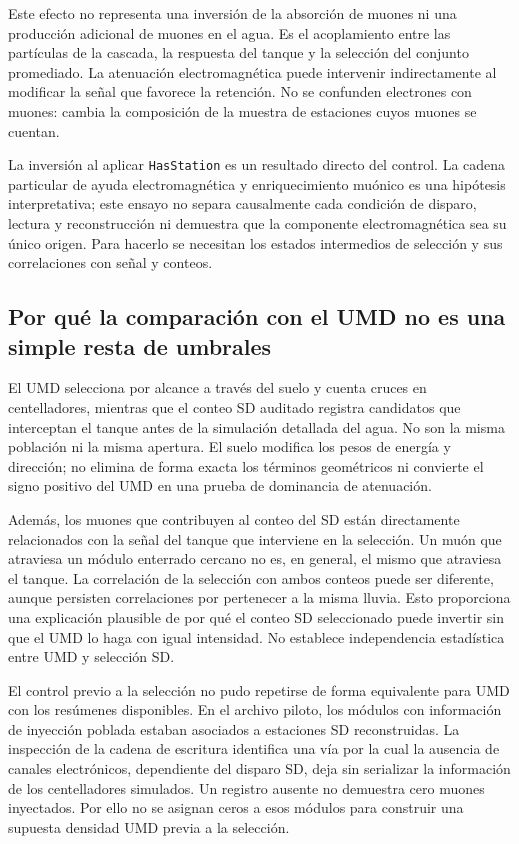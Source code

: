Este efecto no representa una inversión de la absorción de muones ni una producción adicional de muones en el agua. Es el acoplamiento entre las partículas de la cascada, la respuesta del tanque y la selección del conjunto promediado. La atenuación electromagnética puede intervenir indirectamente al modificar la señal que favorece la retención. No se confunden electrones con muones: cambia la composición de la muestra de estaciones cuyos muones se cuentan.

La inversión al aplicar \texttt{HasStation} es un resultado directo del control. La cadena particular de ayuda electromagnética y enriquecimiento muónico es una hipótesis interpretativa; este ensayo no separa causalmente cada condición de disparo, lectura y reconstrucción ni demuestra que la componente electromagnética sea su único origen. Para hacerlo se necesitan los estados intermedios de selección y sus correlaciones con señal y conteos.

\subsection{Por qué la comparación con el UMD no es una simple resta de umbrales}
\label{subsec:umd_poblacion_seleccion}

El UMD selecciona por alcance a través del suelo y cuenta cruces en centelladores, mientras que el conteo SD auditado registra candidatos que interceptan el tanque antes de la simulación detallada del agua. No son la misma población ni la misma apertura. El suelo modifica los pesos de energía y dirección; no elimina de forma exacta los términos geométricos ni convierte el signo positivo del UMD en una prueba de dominancia de atenuación.

Además, los muones que contribuyen al conteo del SD están directamente relacionados con la señal del tanque que interviene en la selección. Un muón que atraviesa un módulo enterrado cercano no es, en general, el mismo que atraviesa el tanque. La correlación de la selección con ambos conteos puede ser diferente, aunque persisten correlaciones por pertenecer a la misma lluvia. Esto proporciona una explicación plausible de por qué el conteo SD seleccionado puede invertir sin que el UMD lo haga con igual intensidad. No establece independencia estadística entre UMD y selección SD.

El control previo a la selección no pudo repetirse de forma equivalente para UMD con los resúmenes disponibles. En el archivo piloto, los módulos con información de inyección poblada estaban asociados a estaciones SD reconstruidas. La inspección de la cadena de escritura identifica una vía por la cual la ausencia de canales electrónicos, dependiente del disparo SD, deja sin serializar la información de los centelladores simulados. Un registro ausente no demuestra cero muones inyectados. Por ello no se asignan ceros a esos módulos para construir una supuesta densidad UMD previa a la selección.

